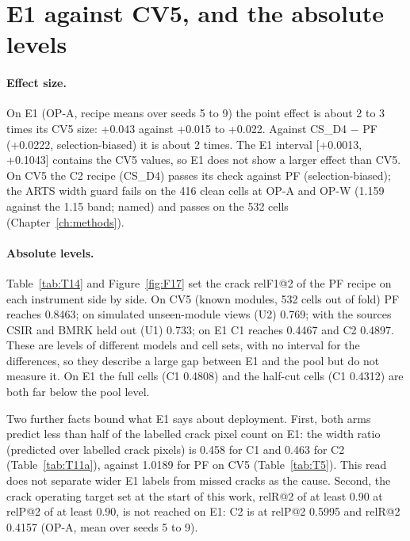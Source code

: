 \section{E1 against CV5, and the absolute levels}\label{sec:e1-cv5}

\paragraph{Effect size.} On E1 (OP-A, recipe means over seeds 5 to 9) the point effect is about 2 to 3 times its CV5 size: +0.043
against +0.015 to +0.022. Against CS\_D4
$-$ PF (+0.0222, selection-biased) it is about 2 times. The E1 interval [+0.0013, +0.1043] contains the CV5 values, so E1 does
not show a larger effect than CV5. On CV5 the C2 recipe (CS\_D4) passes its check against PF (selection-biased); the ARTS width
guard fails on the 416 clean cells at OP-A and OP-W (1.159 against the 1.15 band; named) and passes on the 532 cells
(Chapter~\ref{ch:methods}).

\paragraph{Absolute levels.} Table~\ref{tab:T14} and Figure~\ref{fig:F17} set the crack relF1@2 of the PF recipe on each instrument
side by side. On CV5 (known modules, 532 cells out of fold) PF reaches 0.8463; on simulated unseen-module views (U2) 0.769; with
the sources CSIR and BMRK held out (U1) 0.733; on E1 C1 reaches 0.4467 and C2 0.4897. These are levels of different models and
cell sets, with no interval for the differences, so they describe a large gap between E1 and the pool but do not measure it. On
E1 the full cells (C1 0.4808) and the half-cut cells (C1 0.4312) are both far below the pool level.


Two further facts bound what E1 says about deployment. First, both arms predict less than half of the labelled crack pixel
count on E1: the width ratio (predicted over labelled crack pixels) is 0.458 for C1 and 0.463 for C2 (Table~\ref{tab:T11a}),
against 1.0189 for PF on CV5 (Table~\ref{tab:T5}). This read does not separate wider E1 labels from missed cracks as the cause.
Second, the crack operating target set at the start of this work, relR@2 of at least 0.90 at relP@2 of at least 0.90, is not
reached on E1: C2 is at relP@2 0.5995 and relR@2 0.4157 (OP-A, mean over seeds 5 to 9).

